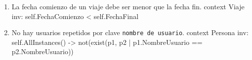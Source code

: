 \begin{enumerate}
	\item \begin{ocl}{La fecha comienzo de un viaje debe ser menor que la fecha fin.}
		  context Viaje
		  inv: self.FechaComienzo < self.FechaFinal
		\end{ocl}

	\item \begin{ocl}{No hay usuarios repetidos por clave \texttt{nombre de usuario}.}
		  context Persona
		  inv: self.AllInstances() -> not(exist(p1, p2 | p1.NombreUsuario == p2.NombreUsuario))
		\end{ocl}
\end{enumerate}
